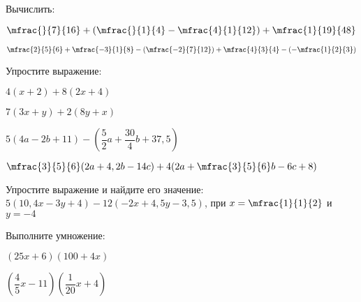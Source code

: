 %
%
\begin{homework}[number=2]
	\begin{listofex}
	\item Вычислить:
		\begin{enumcols}[itemcolumns=2]
			\item \( \mfrac{}{7}{16}+\left( \mfrac{}{1}{4}-\mfrac{4}{1}{12} \right)+\mfrac{1}{19}{48} \)
			\item \( \mfrac{2}{5}{6}+\mfrac{-3}{1}{8}-\left( \mfrac{-2}{7}{12} \right)+\mfrac{4}{3}{4}-\left( -\mfrac{1}{2}{3} \right) \)
		\end{enumcols}
	\item Упростите выражение:
	\begin{enumcols}[itemcolumns=2]
		\item \( 4(x+2)+8(2x+4) \)
		\item \( 7(3x+y)+2(8y+x) \)
		\item \( 5(4a-2b+11)-\left( \dfrac{5}{2}a+\dfrac{30}{4}b+37,5 \right) \)
		\item \( \mfrac{3}{5}{6}(2a+4,2b-14c)+4(2a+\mfrac{3}{5}{6}b-6c+8) \)
	\end{enumcols}
	\item Упростите выражение и найдите его значение: \( 5(10,4x-3y+4)-12(-2x+4,5y-3,5) \), при \( x=\mfrac{1}{1}{2} \) и \( y=-4 \)
	\item Выполните умножение:
	\begin{enumcols}[itemcolumns=2]
		\item \( (25x+6)(100+4x) \)
		\item \( \left(\dfrac{4}{5}x-11\right) \left(\dfrac{1}{20}x+4 \right) \)
	\end{enumcols}
	\end{listofex}
\end{homework}
